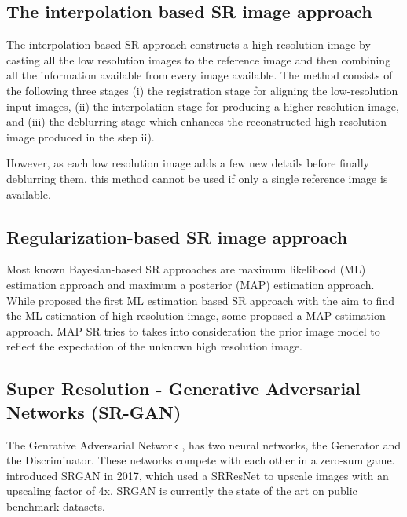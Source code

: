 \documentclass[oneside,a4paper,12pt]{report}
\begin{document}
\subsection{The interpolation based SR image approach}
\hspace*{0.25 in} The interpolation-based SR approach constructs a high resolution image by casting all the low resolution images to the reference image and then combining all the information available from every image available.
			The method consists of the following three stages
			(i) the registration stage for aligning the low-resolution input images,
	    (ii) the interpolation stage for producing a higher-resolution image, and
			(iii) the deblurring stage which enhances the
       reconstructed high-resolution image produced in the step ii).


			However, as each low resolution image adds a few new details before finally deblurring them, this method cannot be used if only a single reference image is available.

\subsection{Regularization-based SR image approach}
\hspace*{0.25 in} Most known Bayesian-based SR approaches are maximum likelihood (ML) estimation approach  and maximum a posterior (MAP) estimation approach.\\
    \hspace*{0.25 in}  While \cite{Brian1996ML} proposed the first ML estimation based SR approach with the aim to find the ML estimation of high resolution image, some proposed a MAP estimation approach. MAP SR tries to takes into consideration the prior image model to reflect the expectation of the unknown high resolution image.

\subsection{Super Resolution - Generative Adversarial Networks (SR-GAN)}
\hspace*{0.25 in} The Genrative Adversarial Network \citep{goodfellow2014generative}, has two neural networks, the Generator and the Discriminator. These networks compete with each other in a zero-sum game.
      \cite{ledig2017photorealistic} introduced SRGAN in 2017, which used a SRResNet to upscale images with an upscaling factor of 4x. SRGAN is currently the state of the art on public benchmark datasets.
\end{document}

